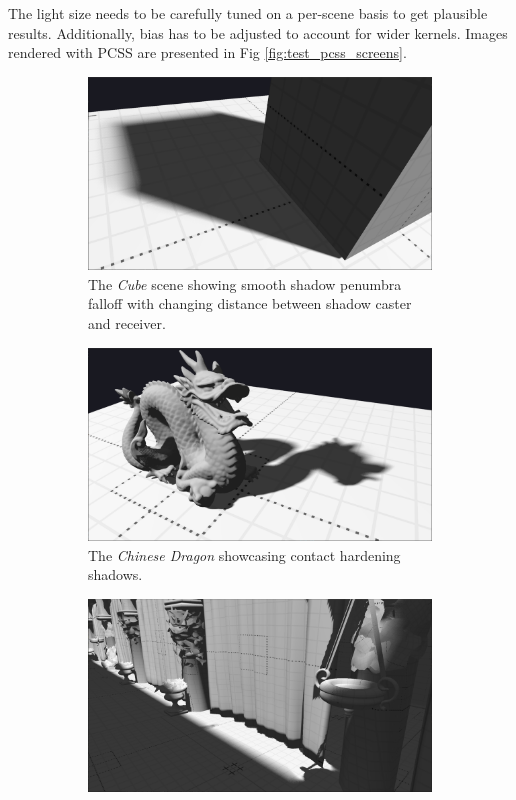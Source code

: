 The light size needs to be carefully tuned on a per-scene basis to get plausible results. Additionally, bias has to be adjusted to account for wider kernels. Images rendered with PCSS are presented in Fig \ref{fig:test_pcss_screens}.
\begin{figure}[h]
    \centering
    \begin{subfigure}[t]{0.49\textwidth}
		\centering
        \includegraphics[width=\textwidth]{./graf/tests/pcss/cropped/cube_pcss_1.png}
        \caption{The \textit{Cube} scene showing smooth shadow penumbra falloff with changing distance between shadow caster and receiver.}
    \end{subfigure}
	\hfill
    \begin{subfigure}[t]{0.49\textwidth}
		\centering
        \includegraphics[width=\textwidth]{./graf/tests/pcss/cropped/dragon_pcss_1.png}
        \caption{The \textit{Chinese Dragon} showcasing contact hardening shadows.}
    \end{subfigure}
    \begin{subfigure}[t]{0.49\textwidth}
		\centering
        \includegraphics[width=\textwidth]{./graf/tests/pcss/cropped/sponza_pcss_1.png}

\end{subfigure}
\end{figure}
